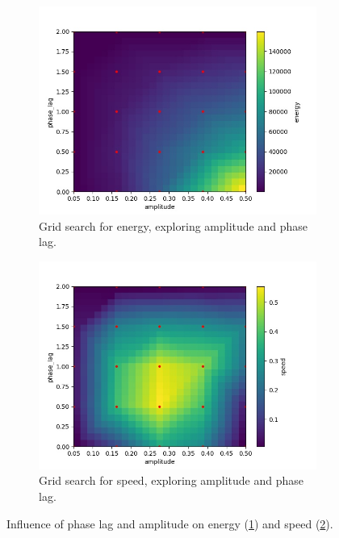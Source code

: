 \documentclass{cmc}
\begin{document}
\begin{figure}[!ht]
  \begin{subfigure}[b]{0.48\textwidth}
    \includegraphics[width=\textwidth]{figures/9b/9b_energy.jpg}
    \caption{Grid search for energy, exploring amplitude and phase lag.}
    \label{fig:9b_energy}
  \end{subfigure}
  \begin{subfigure}[b]{0.48\textwidth}
    \includegraphics[width=\textwidth]{figures/9b/9b_speed.jpg}
    \caption{Grid search for speed, exploring amplitude and phase lag.}
    \label{fig:9b_speed}
  \end{subfigure}
  \caption{Influence of phase lag and amplitude on energy (\ref{fig:9b_energy}) and speed (\ref{fig:9b_speed}).}
  \label{fig:9b}
\end{figure}
\end{document}
